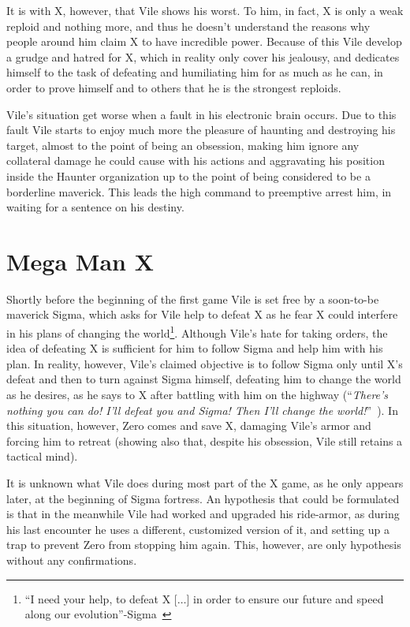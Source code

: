 It is with X, however, that Vile shows his worst. To him, in fact, X is only a weak reploid and nothing more, and thus he doesn't understand the reasons why people around him claim X to have incredible power. Because of this Vile develop a grudge and hatred for X, which in reality only cover his jealousy, and dedicates himself to the task of defeating and humiliating him for as much as he can, in order to prove himself and to others that he is the strongest reploids.

Vile's situation get worse when a fault in his electronic brain occurs. Due to this fault Vile starts to enjoy much more the pleasure of haunting and destroying his target, almost to the point of being an obsession, making him ignore any collateral damage he could cause with his actions and aggravating his position inside the Haunter organization up to the point of being considered to be a borderline maverick. This leads the high command  to preemptive arrest him, in waiting for a sentence on his destiny.

\section{Mega Man X}
Shortly before the beginning of the first game Vile is set free by a soon-to-be maverick Sigma, which asks for Vile help to defeat X as he fear X could interfere in his plans of changing the world\footnote{``I need your help, to defeat X [$\dots$] in order to ensure our future and speed along our evolution''-Sigma~\cite{MHX:Vile_script}}. Although Vile's hate for taking orders, the idea of defeating X is sufficient for him to follow Sigma and help him with his plan. In reality, however, Vile's claimed objective is to follow Sigma only until X's defeat and then to turn against Sigma himself, defeating him to change the world as he desires, as he says to X after battling with him on the highway (``\textit{There's nothing you can do! I'll defeat you and Sigma! Then I'll change the world!}''~\cite{wiki:MM_MHX_script}). In this situation, however, Zero comes and save X, damaging Vile's armor and forcing him to retreat (showing also that, despite his obsession, Vile still retains a tactical mind). 

It is unknown what Vile does during most part of the X game, as he only appears later, at the beginning of Sigma fortress. An hypothesis that could be  formulated is that in the meanwhile Vile had worked and upgraded his ride-armor, as during his last encounter he uses a different, customized version of it, and setting up a trap to prevent Zero from stopping him again. This, however, are only hypothesis without any confirmations.

